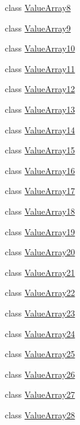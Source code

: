 \begin{DoxyCompactItemize}
class \hyperlink{classtesting_1_1internal_1_1_value_array8}{Value\-Array8}
\item 
class \hyperlink{classtesting_1_1internal_1_1_value_array9}{Value\-Array9}
\item 
class \hyperlink{classtesting_1_1internal_1_1_value_array10}{Value\-Array10}
\item 
class \hyperlink{classtesting_1_1internal_1_1_value_array11}{Value\-Array11}
\item 
class \hyperlink{classtesting_1_1internal_1_1_value_array12}{Value\-Array12}
\item 
class \hyperlink{classtesting_1_1internal_1_1_value_array13}{Value\-Array13}
\item 
class \hyperlink{classtesting_1_1internal_1_1_value_array14}{Value\-Array14}
\item 
class \hyperlink{classtesting_1_1internal_1_1_value_array15}{Value\-Array15}
\item 
class \hyperlink{classtesting_1_1internal_1_1_value_array16}{Value\-Array16}
\item 
class \hyperlink{classtesting_1_1internal_1_1_value_array17}{Value\-Array17}
\item 
class \hyperlink{classtesting_1_1internal_1_1_value_array18}{Value\-Array18}
\item 
class \hyperlink{classtesting_1_1internal_1_1_value_array19}{Value\-Array19}
\item 
class \hyperlink{classtesting_1_1internal_1_1_value_array20}{Value\-Array20}
\item 
class \hyperlink{classtesting_1_1internal_1_1_value_array21}{Value\-Array21}
\item 
class \hyperlink{classtesting_1_1internal_1_1_value_array22}{Value\-Array22}
\item 
class \hyperlink{classtesting_1_1internal_1_1_value_array23}{Value\-Array23}
\item 
class \hyperlink{classtesting_1_1internal_1_1_value_array24}{Value\-Array24}
\item 
class \hyperlink{classtesting_1_1internal_1_1_value_array25}{Value\-Array25}
\item 
class \hyperlink{classtesting_1_1internal_1_1_value_array26}{Value\-Array26}
\item 
class \hyperlink{classtesting_1_1internal_1_1_value_array27}{Value\-Array27}
\item 
class \hyperlink{classtesting_1_1internal_1_1_value_array28}{Value\-Array28}
\item 

\end{DoxyCompactItemize}
